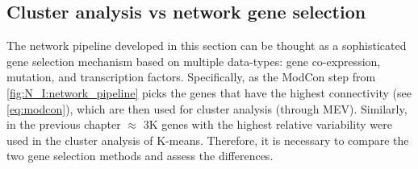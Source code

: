 



\subsection{Cluster analysis vs network gene selection} \label{s:N_I:cs_vs_gene_sel}

The network pipeline developed in this section can be thought as a sophisticated gene selection mechanism based on multiple data-types: gene co-expression, mutation, and transcription factors. Specifically, as the ModCon step from \cref{fig:N_I:network_pipeline} picks the genes that have the highest connectivity (see \cref{eq:modcon}), which are then used for cluster analysis (through MEV). Similarly, in the previous chapter $\approx$ 3K genes with the highest relative variability were used in the cluster analysis of K-means. Therefore, it is necessary to compare the two gene selection methods and assess the differences.

